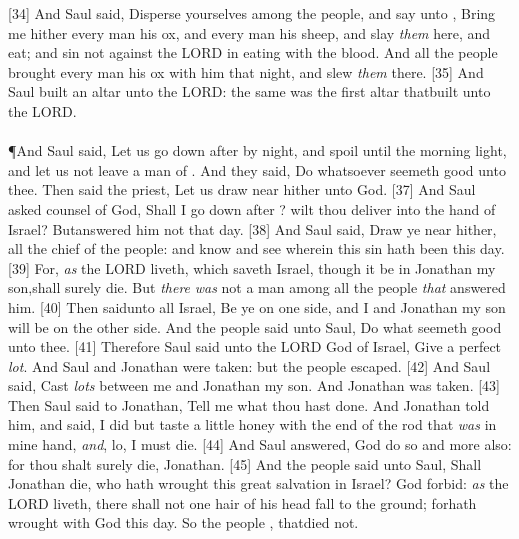 [34] \textcolor[cmyk]{0.99998,1,0,0}{And Saul said, Disperse yourselves among the people, and say unto , Bring me hither every man his ox, and every man his sheep, and slay \emph{them} here, and eat; and sin not against the LORD in eating with the blood. And all the people brought every man his ox with him that night, and slew \emph{them} there.}
[35] \textcolor[cmyk]{0.99998,1,0,0}{And Saul built an altar unto the LORD: the same was the first altar thatbuilt unto the LORD.}\\
\\
\P \textcolor[cmyk]{0.99998,1,0,0}{And Saul said, Let us go down after   by night, and spoil  until the morning light, and let us not leave a man of . And they said, Do whatsoever seemeth good unto thee. Then said the priest, Let us draw near hither unto God.}
[37] \textcolor[cmyk]{0.99998,1,0,0}{And Saul asked counsel of God, Shall I go down after  ? wilt thou deliver  into the hand of Israel? Butanswered him not that day.}
[38] \textcolor[cmyk]{0.99998,1,0,0}{And Saul said, Draw ye near hither, all the chief of the people: and know and see wherein this sin hath been this day.}
[39] \textcolor[cmyk]{0.99998,1,0,0}{For, \emph{as} the LORD liveth, which saveth Israel, though it be in Jonathan my son,shall surely die. But \emph{there} \emph{was} not a man among all the people \emph{that} answered him.}
[40] \textcolor[cmyk]{0.99998,1,0,0}{Then saidunto all Israel, Be ye on one side, and I and Jonathan my son will be on the other side. And the people said unto Saul, Do what seemeth good unto thee.}
[41] \textcolor[cmyk]{0.99998,1,0,0}{Therefore Saul said unto the LORD God of Israel, Give a perfect \emph{lot}. And Saul and Jonathan were taken: but the people escaped.}
[42] \textcolor[cmyk]{0.99998,1,0,0}{And Saul said, Cast \emph{lots} between me and Jonathan my son. And Jonathan was taken.}
[43] \textcolor[cmyk]{0.99998,1,0,0}{Then Saul said to Jonathan, Tell me what thou hast done. And Jonathan told him, and said, I did but taste a little honey with the end of the rod that \emph{was} in mine hand, \emph{and}, lo, I must die.}
[44] \textcolor[cmyk]{0.99998,1,0,0}{And Saul answered, God do so and more also: for thou shalt surely die, Jonathan.}
[45] \textcolor[cmyk]{0.99998,1,0,0}{And the people said unto Saul, Shall Jonathan die, who hath wrought this great salvation in Israel? God forbid: \emph{as} the LORD liveth, there shall not one hair of his head fall to the ground; forhath wrought with God this day. So the people , thatdied not.}
